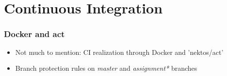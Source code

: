 \section{Continuous Integration}

\begin{frame}
    \frametitle{Docker and act}

    \begin{itemize}
        \item Not much to mention: CI realization through Docker and 'nektos/act'
        \item Branch protection rules on \emph{master} and \emph{assignment*} branches
    \end{itemize}

\end{frame}